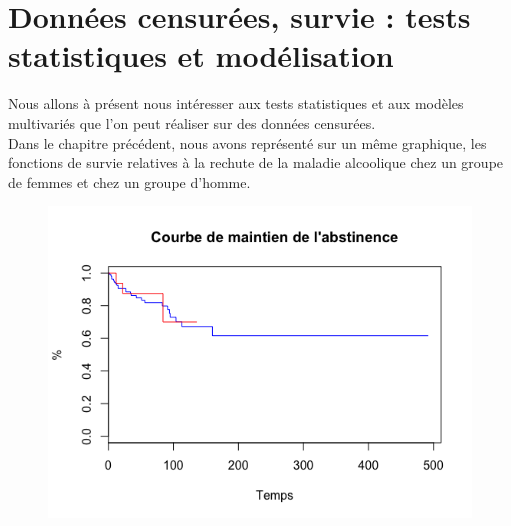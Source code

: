 \newpage




\section{Données censurées, survie : tests statistiques et modélisation}
Nous allons à présent nous intéresser aux tests statistiques et aux modèles multivariés que l'on peut réaliser sur des données censurées.\newline
\\
Dans le chapitre précédent, nous avons représenté sur un même graphique, les fonctions de survie relatives à la rechute de la maladie alcoolique chez un groupe de femmes et chez un groupe d'homme. 

\begin{figure}[H]\begin{center}\includegraphics[scale=0.5]{ilu/dsurv4.png}\end{center}\end{figure}

